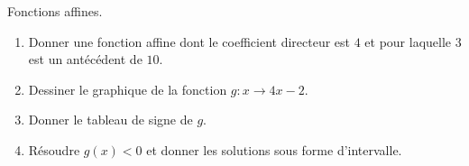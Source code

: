 
\begin{exercice}\label{exosmath-0572}

    Fonctions affines.
    \begin{enumerate}
        \item
            Donner une fonction affine dont le coefficient directeur est \( 4\) et pour laquelle \( 3\) est un antécédent de \( 10\).
        \item
            Dessiner le graphique de la fonction \( g\colon x\to 4x-2\).
        \item
            Donner le tableau de signe de \( g\).
        \item
            Résoudre \( g(x)<0\) et donner les solutions sous forme d'intervalle.
    \end{enumerate}

\end{exercice}
